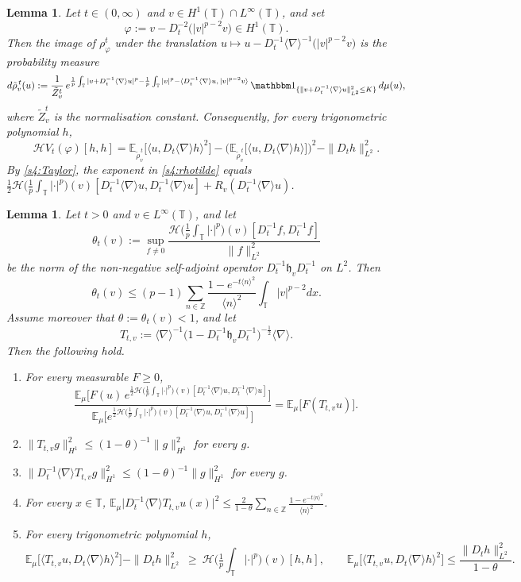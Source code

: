 \documentclass[10pt,a4paper]{amsart}
\theoremstyle{plain}
\newtheorem{lemma}[theorem]{Lemma}
\theoremstyle{definition}
\theoremstyle{remark}
\newcommand{\Z}{\mathbb{Z}}
\newcommand{\T}{\mathbb{T}}
\renewcommand{\H}{\mathcal H}
\newcommand{\E}{\mathbb{E}}
\newcommand{\nb}{\nabla}
\newcommand{\jb}[1]
{\langle #1 \rangle}
\newcommand{\ind}{\mathbbm 1}
\newcommand{\ph}{\varphi}
\newcommand{\HF}[2]{\mathcal H\big(\tfrac1p{\textstyle\int_\T}|\cdot|^p\big)(#1)[#2]}
\newcommand{\WV}[1]{e^{\frac1p\int_\T|#1+D_t^{-1}\jb\nb u|^p-\frac1p\int_\T|#1|^p-\langle D_t^{-1}\jb\nb u,\,|#1|^{p-2}#1\rangle}\,\ind_{\{\|#1+D_t^{-1}\jb\nb u\|_{L^2}^2\le K\}}}
\begin{document}
\begin{lemma}\label{s4:LEM:recentre}
Let $t\in(0,\infty)$ and $v\in H^1(\T)\cap L^\infty(\T)$, and set
\begin{equation}\label{s4:phiv}
\ph:=v-D_t^{-2}\big(|v|^{p-2}v\big)\in H^1(\T).
\end{equation}
Then the image of $\rho^t_\ph$ under the translation
$u\mapsto u-D_t^{-1}\jb\nb^{-1}\big(|v|^{p-2}v\big)$ is the probability measure
\begin{equation}\label{s4:rhotilde}
d\tilde\rho^{\,t}_v(u):=\frac1{\tilde Z^t_v}\,\WV{v}\,d\mu(u),
\end{equation}
where $\tilde Z^t_v$ is the normalisation constant. Consequently, for every
trigonometric polynomial $h$,
\begin{equation}\label{s4:Hessv}
\H V_t(\ph)[h,h]
=\E_{\tilde\rho^{\,t}_v}\big[\jb{u,D_t\jb\nb h}^2\big]-\Big(\E_{\tilde\rho^{\,t}_v}\big[\jb{u,D_t\jb\nb h}\big]\Big)^2-\|D_th\|_{L^2}^2 .
\end{equation}
By \eqref{s4:Taylor}, the exponent in \eqref{s4:rhotilde} equals
$\frac12\HF{v}{D_t^{-1}\jb\nb u,D_t^{-1}\jb\nb u}+R_v(D_t^{-1}\jb\nb u)$.
\end{lemma}

\begin{lemma}
\label{s4:LEM:gauss}
Let $t>0$ and $v\in L^\infty(\T)$, and let
\begin{equation}\label{s4:theta}
\theta_t(v):=\sup_{f\neq0}\frac{\HF{v}{D_t^{-1}f,D_t^{-1}f}}{\|f\|_{L^2}^2}
\end{equation}
be the norm of the non-negative self-adjoint operator $D_t^{-1}\mathfrak h_vD_t^{-1}$ on $L^2$. Then
\begin{equation}\label{s4:thetabound}
\theta_t(v)\le(p-1)\sum_{n\in\Z}\frac{1-e^{-t\jb n^2}}{\jb n^2}\int_\T|v|^{p-2}dx .
\end{equation}
Assume moreover that $\theta:=\theta_t(v)<1$, and let
\[
T_{t,v}:=\jb\nb^{-1}\big(1-D_t^{-1}\mathfrak h_vD_t^{-1}\big)^{-\frac12}\jb\nb .
\]
Then the following hold.
\begin{enumerate}
\item[(i)] For every measurable
$F\ge0$,
\[
\frac{\E_\mu\big[F(u)\,e^{\frac12\HF{v}{D_t^{-1}\jb\nb u,D_t^{-1}\jb\nb u}}\big]}{\E_\mu\big[e^{\frac12\HF{v}{D_t^{-1}\jb\nb u,D_t^{-1}\jb\nb u}}\big]}
=\E_\mu\big[F(T_{t,v}u)\big].
\]
\item[(ii)] $\|T_{t,v}g\|_{H^1}^2\le(1-\theta)^{-1}\|g\|_{H^1}^2$ for every $g$.
\item[(iii)] $\|D_t^{-1}\jb\nb T_{t,v}g\|_{H^1}^2\le(1-\theta)^{-1}\|g\|_{H^1}^2$ for every $g$.
\item[(iv)] For every $x\in\T$, $\displaystyle\E_\mu\big|D_t^{-1}\jb\nb T_{t,v}u(x)\big|^2\le\frac2{1-\theta}\sum_{n\in\Z}\frac{1-e^{-t\jb n^2}}{\jb n^2}$.
\item[(v)] For every trigonometric polynomial $h$,
\[
\E_\mu\big[\jb{T_{t,v}u,D_t\jb\nb h}^2\big]-\|D_th\|_{L^2}^2\ \ge\ \HF{v}{h,h},
\qquad
\E_\mu\big[\jb{T_{t,v}u,D_t\jb\nb h}^2\big]\le\frac{\|D_th\|_{L^2}^2}{1-\theta}.
\]
\end{enumerate}
\end{lemma}
\end{document}
